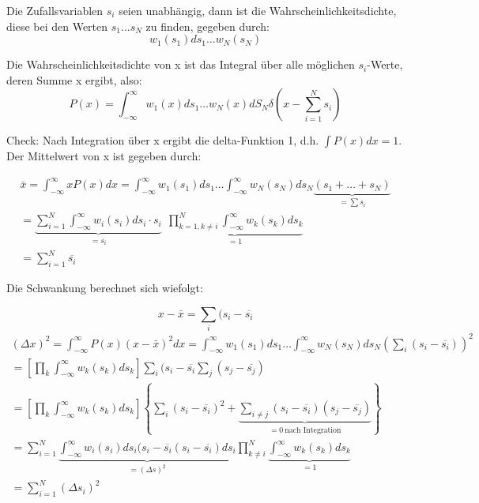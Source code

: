 \documentclass[ngerman]{scrartcl}
\begin{document}
	Die Zufallsvariablen $s_i$ seien unabhängig, dann ist die Wahrscheinlichkeitsdichte, diese bei den Werten $s_1 \dots s_N$ zu finden, gegeben durch:
	\begin{equation}
		w_1(s_1)ds_1 \dots w_N(s_N)
	\end{equation}
	
	Die Wahrscheinlichkeitsdichte von x ist das Integral über alle möglichen $s_i$-Werte, deren Summe x ergibt, also:
	\begin{equation}
		P(x)=\int_{-\infty}^{\infty}w_1(x)ds_1 \dots w_N(x)dS_N \delta\left(x-\sum_{i=1}^N s_i\right)
	\end{equation}
	
	Check: Nach Integration über x ergibt die delta-Funktion 1, d.h. $\int P(x)dx =1$. Der Mittelwert von x ist gegeben durch:
	
	\begin{gather}
		\bar{x}= \int_{-\infty}^{\infty} xP(x)dx=
		\int_{-\infty}^{\infty}w_1(s_1)ds_1 \dots \int_{-\infty}^{\infty}w_N(s_N)ds_N \underbrace{(s_1 + \dots +s_N)}_{=\sum s_i} \\		
		=\underbrace{\sum_{i=1}^N \int_{-\infty}^{\infty} w_i(s_i)ds_i \cdot s_i }_{=\overline{s_i}} ~~\underbrace{\prod_{k=1, k\neq i}^N \int_{-\infty}^{\infty} w_k(s_k)ds_k}_{=1}\\
		=\sum_{i=1}^N \overline{s_i}
	\end{gather}
	
	Die Schwankung berechnet sich wiefolgt:
	
	\begin{equation}
		x-\bar{x}=\sum_i (s_i -\overline{s_i}
	\end{equation}
	\begin{gather}
		(\Delta x)^2=\int_{-\infty}^{\infty} P(x)(x-\bar{x})^2dx=
		\int_{-\infty}^{\infty}w_1(s_1)ds_1 \dots \int_{-\infty}^{\infty}w_N(s_N)ds_N \left(\sum_i (s_i - \overline{s_i}) \right)^2\\
		=\left[\prod_k \int_{-\infty}^{\infty}w_k(s_k)ds_k \right] \sum_i (s_i - \overline{s_i} \sum_j (s_j - \overline{s_j})\\
		=\left[\prod_k \int_{-\infty}^{\infty}w_k(s_k)ds_k \right] \left\lbrace \sum_i (s_i - \overline{s_i})^2 + \underbrace{\sum_{i\neq j}(s_i - \overline{s_i})(s_j - \overline{s_j})}_{=0~ \text{nach Integration}}\right\rbrace\\
		=\sum_{i=1}^N \underbrace{\int_{-\infty}^{\infty}w_i(s_i)ds_i(s_i -\overline{s_i}(s_i - \overline{s_i})ds_i}_{=(\Delta s)^2} \prod_{k\neq i}^N \underbrace{\int_{-\infty}^{\infty} w_k(s_k)ds_k}_{=1}\\
		=\sum_{i=1}^N (\Delta s_i)^2
	\end{gather}
	
\end{document}
